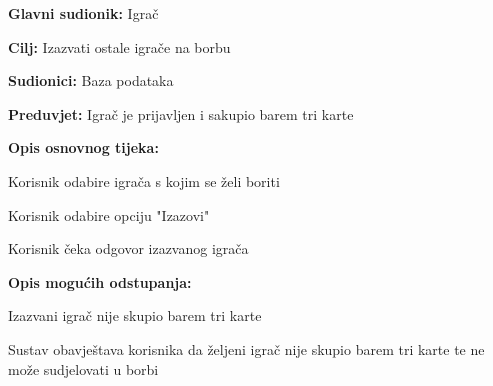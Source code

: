 					\noindent {}
					\begin{packed_item}
						
						\item \textbf{Glavni sudionik: }Igrač
						\item  \textbf{Cilj:} Izazvati ostale igrače na borbu
						\item  \textbf{Sudionici:} Baza podataka
						\item  \textbf{Preduvjet:} Igrač je prijavljen i sakupio barem tri karte
						\item  \textbf{Opis osnovnog tijeka:}
						
						\item[] \begin{packed_enum}
							
							\item Korisnik odabire igrača s kojim se želi boriti
							\item Korisnik odabire opciju "Izazovi"
							\item Korisnik čeka odgovor izazvanog igrača
						\end{packed_enum}
						
						\item  \textbf{Opis mogućih odstupanja:}
						
						\item[] \begin{packed_item}
							
							\item Izazvani igrač nije skupio barem tri karte
							\item[] \begin{packed_enum}
								
								\item Sustav obavještava korisnika da željeni igrač nije skupio barem tri karte te ne može sudjelovati u borbi
								
							\end{packed_enum}
						\end{packed_item}
					\end{packed_item}
					
